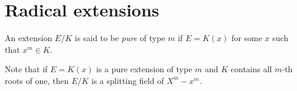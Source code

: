 %
%
%
%
%
%
%
%    


\section{Radical extensions}

\begin{definition}
    An extension $E/K$ is said to be \emph{pure} of type $m$ if 
    $E=K(x)$ for some $x$ such that $x^m\in K$. 
\end{definition}

Note that if $E=K(x)$ is a pure extension of type $m$ and $K$ contains all
$m$-th roots of one, then $E/K$ is a splitting field of $X^m-x^m$. 

